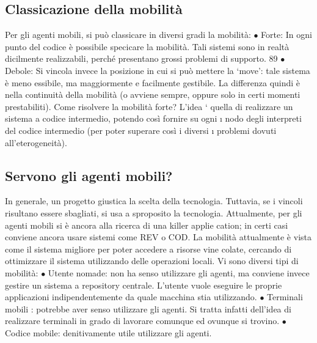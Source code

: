 \subsection{Classicazione della mobilità}
Per gli agenti mobili, si può classicare in diversi gradi la mobilità:
$\bullet$ Forte: In ogni punto del codice è possibile specicare la mobilità. Tali
sistemi sono in realtà dicilmente realizzabili, perché presentano grossi
problemi di supporto.
89
$\bullet$ Debole: Si vincola invece la posizione in cui si può mettere la {`}move': tale
sistema è meno essibile, ma maggiormente e facilmente gestibile.
La differenza quindi è nella continuità della mobilità (o avviene sempre, oppure
solo in certi momenti prestabiliti). Come risolvere la mobilità forte? L'idea `
quella di realizzare un sistema a codice intermedio, potendo così fornire su ogni
\i{}
nodo degli interpreti del codice intermedio (per poter superare così i diversi
\i{}
problemi dovuti all'eterogeneità).
\subsection{Servono gli agenti mobili?}
In generale, un progetto giustica la scelta della tecnologia. Tuttavia, se i vincoli
risultano essere sbagliati, si usa a sproposito la tecnologia.
Attualmente, per gli agenti mobili si è ancora alla ricerca di una killer applie
cation; in certi casi conviene ancora usare sistemi come REV o COD. La mobilità
attualmente è vista come il sistema migliore per poter accedere a risorse vine
colate, cercando di ottimizzare il sistema utilizzando delle operazioni locali. Vi
sono diversi tipi di mobilità:
$\bullet$ Utente nomade: non ha senso utilizzare gli agenti, ma conviene invece
gestire un sistema a repository centrale. L'utente vuole eseguire le proprie
applicazioni indipendentemente da quale macchina stia utilizzando.
$\bullet$ Terminali mobili : potrebbe aver senso utilizzare gli agenti. Si tratta infatti
dell'idea di realizzare terminali in grado di lavorare comunque ed ovunque
si trovino.
$\bullet$ Codice mobile: denitivamente utile utilizzare gli agenti.
